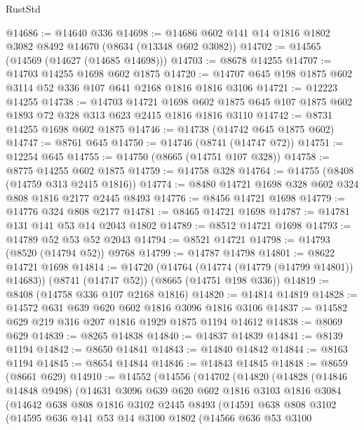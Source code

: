 \begin{lexlean}{RustStd}
\begin{coremodule}
@14686 := @14640 @336
@14698 := @14686 @602 @141 @14 @1816 @1802 @3082 @8492 @14670 (@8634 (@13348 @602 @3082))
@14702 := @14565 (@14569 (@14627 (@14685 @14698)))
@14703 := @8678 @14255
@14707 := @14703 @14255 @1698 @602 @1875
@14720 := @14707 @645 @198 @1875 @602 @3114 @52 @336 @107 @641 @2168 @1816 @1816 @3106
@14721 := @12223 @14255
@14738 := @14703
    @14721
    @1698
    @602
    @1875
    @645
    @107
    @1875
    @602
    @1893
    @72
    @328
    @313
    @623
    @2415
    @1816
    @1816
    @3110
@14742 := @8731 @14255 @1698 @602 @1875
@14746 := @14738 (@14742 @645 @1875 @602)
@14747 := @8761 @645
@14750 := @14746 (@8741 (@14747 @72))
@14751 := @12254 @645
@14755 := @14750 (@8665 (@14751 @107 @328))
@14758 := @8775 @14255 @602 @1875
@14759 := @14758 @328
@14764 := @14755 (@8408 (@14759 @313 @2415 @1816))
@14774 := @8480 @14721 @1698 @328 @602 @324 @808 @1816 @2177 @2445 @8493
@14776 := @8456 @14721 @1698
@14779 := @14776 @324 @808 @2177
@14781 := @8465 @14721 @1698
@14787 := @14781 @131 @141 @53 @14 @2043 @1802
@14789 := @8512 @14721 @1698
@14793 := @14789 @52 @53 @52 @2043
@14794 := @8521 @14721
@14798 := @14793 (@8520 (@14794 @52)) @9768
@14799 := @14787 @14798
@14801 := @8622 @14721 @1698
@14814 := @14720
    (@14764 (@14774 (@14779 (@14799 @14801)) @14683))
    (@8741 (@14747 @52))
    (@8665 (@14751 @198 @336))
@14819 := @8408 (@14758 @336 @107 @2168 @1816)
@14820 := @14814 @14819
@14828 := @14572 @631 @639 @620 @602 @1816 @3096 @1816 @3106
@14837 := @14582 @629 @219 @316 @207 @1816 @1929 @1875 @1194 @14612
@14838 := @8069 @629
@14839 := @8265 @14838
@14840 := @14837 @14839
@14841 := @8139 @1194
@14842 := @8650 @14841
@14843 := @14840 @14842
@14844 := @8163 @1194
@14845 := @8654 @14844
@14846 := @14843 @14845
@14848 := @8659 (@8661 @629)
@14910 := @14552
    (@14556
      (@14702
        (@14820
          (@14828
            (@14846 @14848 @9498)
            (@14631
              @3096
              @639
              @620
              @602
              @1816
              @3103
              @1816
              @3084
              (@14642
                @638
                @808
                @1816
                @3102
                @2445
                @8493
                (@14591
                  @638
                  @808
                  @3102
                  (@14595
                    @636
                    @141
                    @53
                    @14
                    @3100
                    @1802
                    (@14566
                      @636
                      @53
                      @3100

\end{coremodule}
\end{lexlean}
